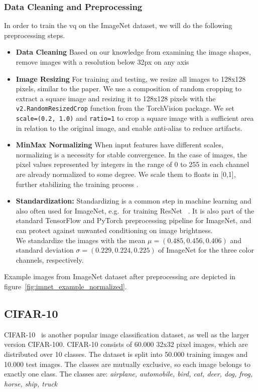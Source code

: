\subsubsection{Data Cleaning and Preprocessing}
In order to train the \ac{vq} on the ImageNet dataset, we will do the following preprocessing steps.

\begin{itemize}
    \item \textbf{Data Cleaning}
    Based on our knowledge from examining the image shapes, remove images with a resolution below 32px on any axis
    \item \textbf{Image Resizing}
    For training and testing, we resize all images to 128x128 pixels, similar to the paper.
    We use a composition of random cropping to extract a square image and resizing it to 128x128 pixels with
    the \texttt{v2.RandomResizedCrop} function from the TorchVision package.
    We set \texttt{scale=(0.2, 1.0)} and \texttt{ratio=1} to crop a square image with a sufficient area in
    relation to the original image, and enable anti-alias to reduce artifacts.
    \item \textbf{MinMax Normalizing}
    When input features have different scales, normalizing is a necessity for stable convergence.
    In the case of images, the pixel values represented by integers in the range of 0 to 255
    in each channel are already normalized to some degree.
    We scale them to floats in [0,1], further stabilizing the training process \cite{citationNeeded}.
    \item \textbf{Standardization:}
    Standardizing is a common step in machine learning and also often used for ImageNet, e.g.\ for training ResNet
    ~\cite{resnet}.
    It is also part of the standard TensorFlow and PyTorch preprocessing pipeline for ImageNet, and can protect
    against unwanted conditioning on image brightness. \\
    We standardize the images with the mean $\mu = (0.485, 0.456, 0.406)$ and standard deviation
    $\sigma = (0.229, 0.224, 0.225)$ of ImageNet for the three color channels, respectively.
\end{itemize}

Example images from ImageNet dataset after preprocessing are depicted in figure~\ref{fig:imnet_example_normalized}.

\subsection{CIFAR-10}\label{subsec:cifar-10}
CIFAR-10~\cite{cifar10} is another popular image classification dataset, as well as the larger version CIFAR-100.
CIFAR-10 consists of 60.000 32x32 pixel images, which are distributed over 10 classes.
The dataset is split into 50.000 training images and 10.000 test images.
The classes are mutually exclusive, so each image belongs to exactly one class.
The classes are: \textit{airplane, automobile, bird, cat, deer, dog, frog, horse, ship, truck}

